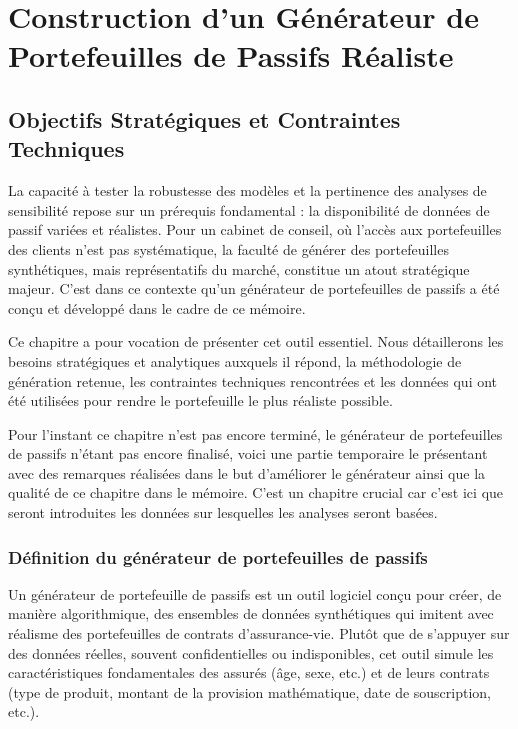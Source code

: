 \chapter{Construction d'un Générateur de Portefeuilles de Passifs Réaliste}

\section{Objectifs Stratégiques et Contraintes Techniques}
La capacité à tester la robustesse des modèles et la pertinence des analyses de sensibilité repose sur un prérequis fondamental : la disponibilité de données de passif variées et réalistes. Pour un cabinet de conseil, où l'accès aux portefeuilles des clients n'est pas systématique, la faculté de générer des portefeuilles synthétiques, mais représentatifs du marché, constitue un atout stratégique majeur. C'est dans ce contexte qu'un générateur de portefeuilles de passifs a été conçu et développé dans le cadre de ce mémoire.

Ce chapitre a pour vocation de présenter cet outil essentiel. Nous détaillerons les besoins stratégiques et analytiques auxquels il répond, la méthodologie de génération retenue, les contraintes techniques rencontrées et les données qui ont été utilisées pour rendre le portefeuille le plus réaliste possible.

Pour l'instant ce chapitre n'est pas encore terminé, le générateur de portefeuilles de passifs n'étant pas encore finalisé, voici une partie temporaire le présentant avec des remarques réalisées dans le but d'améliorer le générateur ainsi que la qualité de ce chapitre dans le mémoire. C'est un chapitre crucial car c'est ici que seront introduites les données sur lesquelles les analyses seront basées.
 
\subsection{Définition du générateur de portefeuilles de passifs}
Un générateur de portefeuille de passifs est un outil logiciel conçu pour créer, de manière algorithmique, des ensembles de données synthétiques qui imitent avec réalisme des portefeuilles de contrats d'assurance-vie. Plutôt que de s'appuyer sur des données réelles, souvent confidentielles ou indisponibles, cet outil simule les caractéristiques fondamentales des assurés (âge, sexe, etc.) et de leurs contrats (type de produit, montant de la provision mathématique, date de souscription, etc.).


